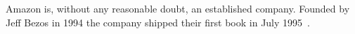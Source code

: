 {}

Amazon is, without any reasonable doubt, an established company.
Founded by Jeff Bezos in 1994 the company shipped their first book in July 1995~\cite{seattle}.

